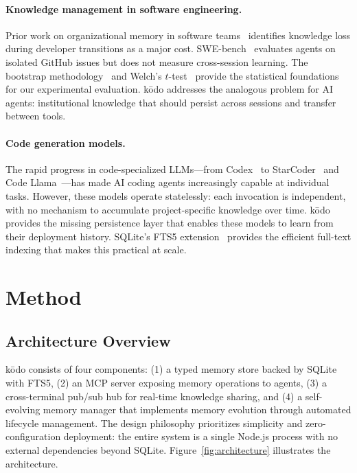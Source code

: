 \documentclass{article}
\begin{document}
\paragraph{Knowledge management in software engineering.} Prior work on organizational memory in software teams~\cite{robillard2004effective,ko2007information} identifies knowledge loss during developer transitions as a major cost. SWE-bench~\cite{jimenez2024swebench} evaluates agents on isolated GitHub issues but does not measure cross-session learning. The bootstrap methodology~\cite{efron1993bootstrap} and Welch's $t$-test~\cite{welch1947} provide the statistical foundations for our experimental evaluation. k\=odo addresses the analogous problem for AI agents: institutional knowledge that should persist across sessions and transfer between tools.

\paragraph{Code generation models.} The rapid progress in code-specialized LLMs---from Codex~\cite{chen2021codex} to StarCoder~\cite{li2023starcoder} and Code Llama~\cite{roziere2023codellama}---has made AI coding agents increasingly capable at individual tasks. However, these models operate statelessly: each invocation is independent, with no mechanism to accumulate project-specific knowledge over time. k\=odo provides the missing persistence layer that enables these models to learn from their deployment history. SQLite's FTS5 extension~\cite{sqlite2024} provides the efficient full-text indexing that makes this practical at scale.

\section{Method}
\label{sec:method}

\subsection{Architecture Overview}

k\=odo consists of four components: (1) a typed memory store backed by SQLite with FTS5, (2) an MCP server exposing memory operations to agents, (3) a cross-terminal pub/sub hub for real-time knowledge sharing, and (4) a self-evolving memory manager that implements memory evolution through automated lifecycle management. The design philosophy prioritizes simplicity and zero-configuration deployment: the entire system is a single Node.js process with no external dependencies beyond SQLite. Figure~\ref{fig:architecture} illustrates the architecture.
\end{document}
